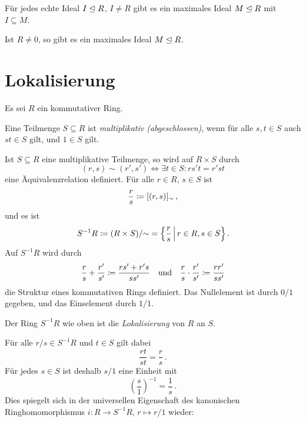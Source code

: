 \begin{lemma}
  Für jedes echte Ideal $I \mathrel{\trianglelefteq} R$, $I \neq R$ gibt es ein maximales Ideal $M \mathrel{\trianglelefteq} R$ mit $I \subseteq M$.
\end{lemma}

\begin{corollary}
  Ist $R \neq 0$, so gibt es ein maximales Ideal $M \mathrel{\trianglelefteq} R$.
\end{corollary}





\section{Lokalisierung}

Es sei $R$ ein kommutativer Ring.

\begin{definition}
  Eine Teilmenge $S \subseteq R$ ist \emph{multiplikativ \textup(abgeschlossen\textup)}, wenn für alle $s, t \in S$ auch $st \in S$ gilt, und $1 \in S$ gilt.
\end{definition}

Ist $S \subseteq R$ eine multiplikative Teilmenge, so wird auf $R \times S$ durch
\begin{equation}
\label{equation: formula for localization}
        (r,s) \sim (r', s')
  \iff  \exists t \in S:
        rs't = r'st
\end{equation}
eine Äquivalenzrelation definiert.
Für alle $r \in R$, $s \in S$ ist
\[
            \frac{r}{s}
  \coloneqq  [(r,s)]_{\sim} \,,
\]
und es ist
\[
            S^{-1} R
  \defined  (R \times S)/{\sim}
  =         \left\{
              \frac{r}{s}
            \suchthat*
              r \in R,
              s \in S
            \right\}.
\]
Auf $S^{-1} R$ wird durch
\[
              \frac{r}{s}
            + \frac{r'}{s'}
  \coloneqq  \frac{rs' + r's}{ss'}
  \quad\text{und}\quad
                  \frac{r}{s}
            \cdot \frac{r'}{s'}
  \coloneqq  \frac{rr'}{ss'}
\]
die Struktur eines kommutativen Rings definiert.
Das Nullelement ist durch $0/1$ gegeben, und das Einselement durch $1/1$.

\begin{definition}
  Der Ring $S^{-1} R$ wie oben ist die \emph{Lokalisierung} von $R$ an $S$.
\end{definition}


Für alle $r/s \in S^{-1} R$ und $t \in S$ gilt dabei
\[
    \frac{rt}{st}
  = \frac{r}{s} \,.
\]
Für jedes $s \in S$ ist deshalb $s/1$ eine Einheit mit
\[
    \left( \frac{s}{1} \right)^{-1}
  = \frac{1}{s} \,.
\]
Dies spiegelt sich in der universellen Eigenschaft des kanonischen Ringhomomorphismus $i \colon R \to S^{-1} R$, $r \mapsto r/1$ wieder:

